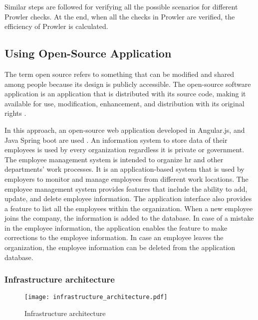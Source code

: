 \par Similar steps are followed for verifying all the possible scenarios for different Prowler checks. At the end, when all the checks in Prowler are verified, the efficiency of Prowler is calculated.

\subsection{Using Open-Source Application}

\par The term open source refers to something that can be modified and shared among people because its design is publicly accessible.
The open-source software application is an application that is distributed with its source code, making it available
for use, modification, enhancement, and distribution with
its original rights \cite{77}.

\par \par In this approach, an open-source web
application developed in Angular.js, and Java Spring boot
are used \cite{78}.
An information system to store data of their employees is
used by every organization regardless it is private or government.
The employee management system is intended to organize
\gls{hr}
and other departments' work processes.
It is an application-based system that is used by employers to monitor and manage employees from different work locations.
The employee management system provides features that include the ability to add, update, and delete employee information.
The application interface also provides a feature to list all the employees within the organization.
When a new employee joins the company, the information is added to the database.
In case of a mistake in the employee information, the application enables the feature to make corrections to the employee information.
In case an employee leaves the organization, the employee information can be deleted from the application database.

\subsubsection{Infrastructure architecture}

\begin{figure}
    \centering
    \texttt{[image: infrastructure\_architecture.pdf]}
    \caption{Infrastructure architecture}
    \label{fig:infrastructure_architecture}
\end{figure}

